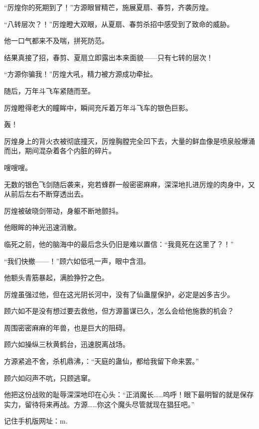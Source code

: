 \begin{this_body}
“厉煌你的死期到了！”方源眼冒精芒，施展夏扇、春剪，齐袭厉煌。

“八转层次？！”厉煌瞪大双眼，从夏扇、春剪杀招中感受到了致命的威胁。

他一口气都来不及喘，拼死防范。

结果真接了招，春剪、夏扇立即露出本来面貌——只有七转的层次！

“方源你骗我！”厉煌大吼，精力被方源成功牵扯。

随后，万年斗飞车紧随而至。

厉煌瞪得老大的瞳眸中，瞬间充斥着万年斗飞车的银色巨影。

轰！

厉煌身上的背火衣被彻底撞灭，厉煌胸膛完全凹下去，大量的鲜血像是喷泉般爆涌而出，期间混杂着各个内脏的碎片。

嗖嗖嗖。

无数的银色飞剑随后袭来，宛若蜂群一般密密麻麻，深深地扎进厉煌的肉身中，又从前后左右不断穿透出去。

厉煌被破晓剑带动，身躯不断地颤抖。

他眼眸的神光迅速消散。

临死之前，他的脑海中的最后念头仍旧是难以置信：“我竟死在这里了？！”

“我们快撤——！”顾六如低吼一声，眼中含泪。

他额头青筋暴起，满脸狰狞之色。

厉煌虽强过他，但在这光阴长河中，没有了仙蛊屋保护，必定是凶多吉少。

顾六如不是没有想过要去救他，但方源蓄谋已久，怎么会给他施救的机会？

周围密密麻麻的年兽，也是巨大的阻碍。

顾六如操纵三秋黄鹤台，迅速脱离战场。

方源紧追不舍，杀机鼎沸，：“天庭的蛊仙，都给我留下命来罢。”

顾六如闷声不吭，只顾逃窜。

他把这份战败的耻辱深深地印在心头：“正消魔长……呜呼！眼下最明智的就是保存实力，留待将来再战。方源……你这个魔头尽管就现在猖狂吧。”

记住手机版网址：m.

\end{this_body}


